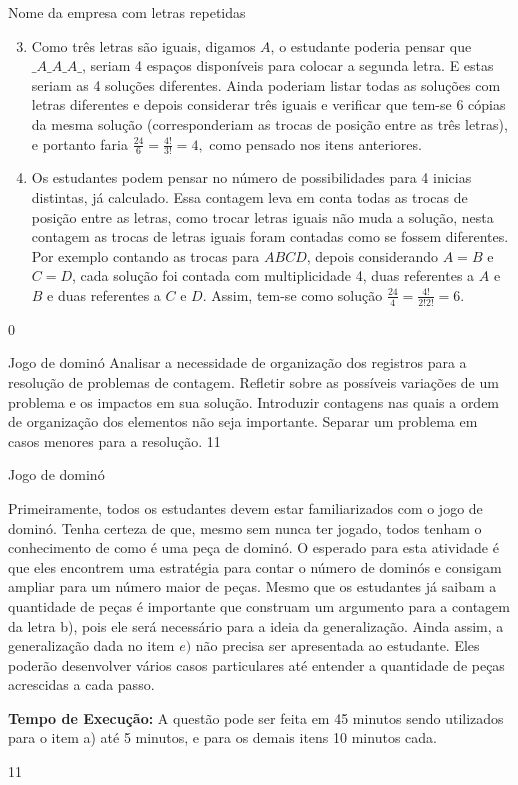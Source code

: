 \begin{answer}{Nome da empresa com letras repetidas}
{
\begin{enumerate}\setcounter{enumi}{2}

\item  Como três letras são iguais, digamos $A$, o estudante poderia pensar que $\_A\_A\_A\_$, seriam 4 espaços disponíveis para colocar a segunda letra. E estas seriam as 4 soluções diferentes. Ainda poderiam listar todas as soluções com letras diferentes e depois considerar três iguais e verificar que tem-se 6 cópias da mesma solução (corresponderiam as trocas de posição entre as três letras), e portanto faria $\frac{24}{6} = \frac{4!}{3!}=4,$ como pensado nos itens anteriores.
\item  Os estudantes podem pensar no número de possibilidades para 4 inicias distintas, já calculado. Essa contagem leva em conta todas as trocas de posição entre as letras, como trocar letras iguais não muda a solução, nesta contagem as trocas de letras iguais foram contadas como se fossem diferentes. Por exemplo contando as trocas para $ABCD$, depois considerando $A=B$ e $C=D$, cada solução foi contada com multiplicidade 4, duas referentes a $A$ e $B$ e duas referentes a $C$ e $D$. Assim, tem-se como solução $\frac{24}{4} = \frac{4!}{2!2!}=6.$
\end{enumerate}
}{0}
\end{answer}

\begin{objectives}{Jogo de dominó}
{
Analisar a necessidade de organização dos registros para a resolução de problemas de contagem. Refletir sobre as possíveis variações de um problema e os impactos em sua solução. Introduzir contagens nas quais a ordem de organização dos elementos não seja importante. Separar um problema em casos menores para a resolução.
}{1}{1}
\end{objectives}
\mspace{-2.25em}
\begin{sugestions}{Jogo de dominó}
{
Primeiramente, todos os estudantes devem estar familiarizados com o jogo de dominó. Tenha certeza de que, mesmo sem nunca ter jogado, todos tenham o conhecimento de como é uma peça de dominó. O esperado para esta atividade é que eles encontrem uma estratégia para contar o número de dominós e consigam ampliar para um número maior de peças. Mesmo que os estudantes já saibam a quantidade de peças é importante que construam um argumento para a contagem da letra b), pois ele será necessário para a ideia da generalização. Ainda assim, a generalização dada no item $e)$ não precisa ser apresentada ao estudante. Eles poderão desenvolver vários casos particulares até entender a quantidade de peças acrescidas a cada passo.

\textbf{Tempo de Execução:} A questão pode ser feita em 45 minutos sendo utilizados para o item a) até 5  minutos, e para os demais itens 10 minutos cada.
}{1}{1}
\end{sugestions}
\mspace{-1.5em}

